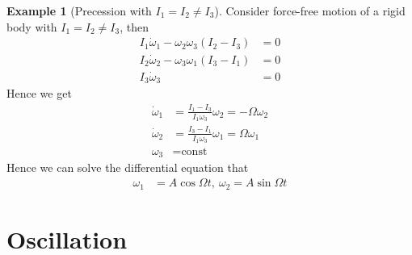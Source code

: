 \documentclass[twoside,9pt]{article}
\numberwithin{equation}{section} %
\newcommand{\lms}{\fontfamily{lmss}\selectfont} %
\theoremstyle{definition}
\newtheorem{example}{\lms Example}[section]
\theoremstyle{remark}
\begin{document}
\begin{example}[Precession with $I_1=I_2\neq I_3$]
Consider force-free motion of a rigid body with $I_1=I_2\neq I_3$, then
\begin{align}
    I_1\dot\omega_1 - \omega_2\omega_3(I_2 - I_3) &= 0\\
    I_2\dot\omega_2 - \omega_3\omega_1(I_3 - I_1) &= 0\\
    I_3\dot\omega_3 &= 0
\end{align}
Hence we get
\begin{align}
    \dot\omega_1 &= \frac{I_1 - I_3}{I_1\omega_3}\omega_2 = -\Omega\omega_2\\
    \dot\omega_2 &= \frac{I_3 - I_1}{I_1\omega_3}\omega_1 = \Omega\omega_1\\
    \omega_3 &= \text{const}
\end{align}
Hence we can solve the differential equation that
\begin{align}
    \omega_1 &= A\cos\Omega t,~
    \omega_2  = A\sin\Omega t
\end{align}
\end{example}


\newpage
\section{Oscillation}
\end{document}
